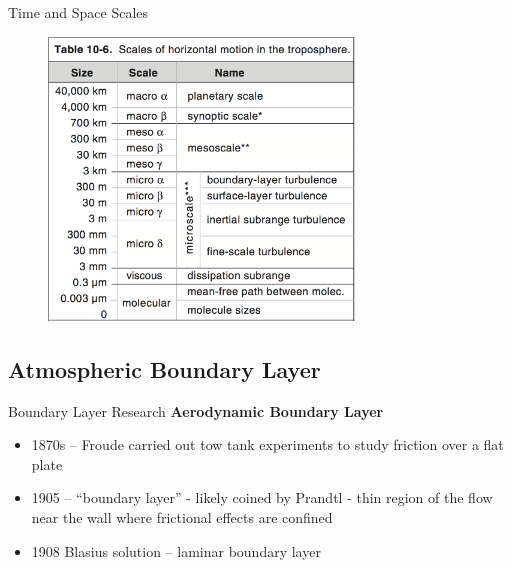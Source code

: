 \begin{frame}{Time and Space Scales}

\begin{figure}
	\includegraphics[width=0.725\textwidth]{scales4.png}
\end{figure}
\end{frame}

\subsection{Atmospheric Boundary Layer}
\begin{frame}{Boundary Layer Research}
\textbf{Aerodynamic Boundary Layer}
\begin{itemize}
	\item 1870s – Froude carried out tow tank experiments to study friction over a flat plate
	\item 1905 – ``boundary layer'' - likely coined by Prandtl - thin region of the flow near the wall where frictional effects are confined
	\item 1908 Blasius solution – laminar boundary layer
\end{itemize}
\end{frame}

